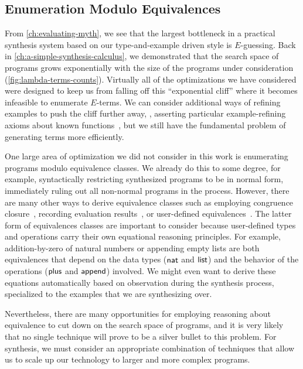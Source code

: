 \subsection{Enumeration Modulo Equivalences}
\label{subsec:enumeration-modulo-equivalences}

From \autoref{ch:evaluating-myth}, we see that the largest bottleneck in a practical synthesis system based on our type-and-example driven style is $E$-guessing.
Back in \autoref{ch:a-simple-synthesis-calculus}, we demonstrated that the search space of programs grows exponentially with the size of the programs under consideration (\autoref{fig:lambda-terms-counts}).
Virtually all of the optimizations we have considered were designed to keep us from falling off this ``exponential cliff'' where it becomes infeasible to enumerate $E$-terms.
We can consider additional ways of refining examples to push the cliff further away, \eg, asserting particular example-refining axioms about known functions~\cite{feser-pldi-2015}, but we still have the fundamental problem of generating terms more efficiently.

One large area of optimization we did not consider in this work is enumerating programs modulo equivalence classes.
We already do this to some degree, for example, syntactically restricting synthesized programs to be in normal form, immediately ruling out all non-normal programs in the process.
However, there are many other ways to derive equivalence classes such as employing congruence closure~\cite{nelson-jacm-1980}, recording evaluation results~\cite{albarghouthi-cav-2013}, or user-defined equivalences~\cite{feser-pldi-2015}.
The latter form of equivalences classes are important to consider because user-defined types and operations carry their own equational reasoning principles.
For example, addition-by-zero of natural numbers or appending empty lists are both equivalences that depend on the data types ($\mathsf{nat}$ and $\mathsf{list}$) and the behavior of the operations ($\mathsf{plus}$ and $\mathsf{append}$) involved.
We might even want to derive these equations automatically based on observation during the synthesis process, specialized to the examples that we are synthesizing over.

Nevertheless, there are many opportunities for employing reasoning about equivalence to cut down on the search space of programs, and it is very likely that no single technique will prove to be a silver bullet to this problem.
For synthesis, we must consider an appropriate combination of techniques that allow us to scale up our technology to larger and more complex programs.

